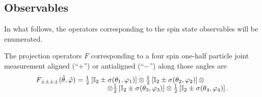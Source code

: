 \documentclass[fleqn,twoside]{article}      %
\begin{document}
\subsection{Observables}

In what follows, the operators corresponding to the spin state observables will be enumerated.



The projection operators $F$
corresponding to a four spin one-half particle joint measurement
aligned (``$+$'') or antialigned  (``$-$'') along those angles are
\begin{equation}
\begin{array}{lll}
 F_{\pm \pm \pm \pm} ({\hat \theta},{\hat \varphi} ) =
{\frac{1}{2}}\left[{\mathbb I}_2 \pm {\bf \sigma}( \theta_1,\varphi_1 )\right]
\otimes
{\frac{1}{2}}\left[{\mathbb I}_2 \pm {\bf \sigma}( \theta_2,\varphi_2 )\right] \otimes
\nonumber\\
\qquad\qquad\qquad\qquad\qquad
\otimes
{\frac{1}{2}}\left[{\mathbb I}_2 \pm {\bf \sigma}( \theta_3,\varphi_3 )\right]
\otimes
{\frac{1}{2}}\left[{\mathbb I}_2 \pm {\bf \sigma}( \theta_4,\varphi_4 )\right].
\end{array}
\label{2004-gtq-e2}
\end{equation}
\end{document}
